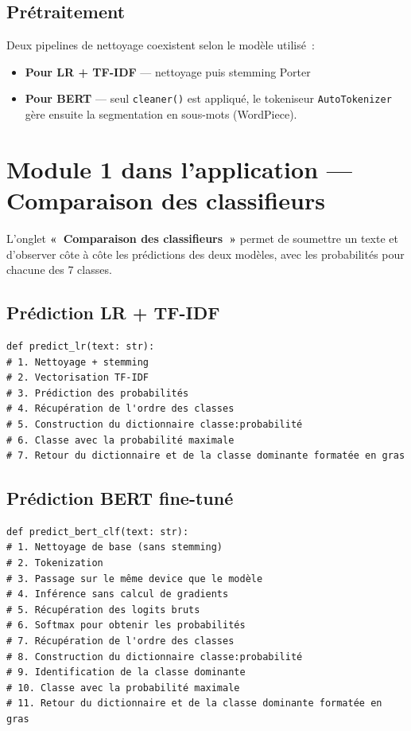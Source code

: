 \documentclass[12pt,a4paper]{report}
\begin{document}
\subsection{Prétraitement}

Deux pipelines de nettoyage coexistent selon le modèle utilisé~:

\begin{itemize}
\item \textbf{Pour LR + TF-IDF} — nettoyage puis stemming Porter
\item \textbf{Pour BERT} — seul \texttt{cleaner()} est appliqué, le tokeniseur \texttt{AutoTokenizer} gère ensuite la segmentation en sous-mots (WordPiece).
\end{itemize}

\section{Module 1 dans l'application — Comparaison des classifieurs}

L'onglet \textbf{«~Comparaison des classifieurs~»} permet de soumettre un texte et
d'observer côte à côte les prédictions des deux modèles, avec les probabilités pour
chacune des 7 classes.

\subsection{Prédiction LR + TF-IDF}

\begin{lstlisting}
def predict_lr(text: str):
# 1. Nettoyage + stemming
# 2. Vectorisation TF-IDF
# 3. Prédiction des probabilités
# 4. Récupération de l'ordre des classes
# 5. Construction du dictionnaire classe:probabilité
# 6. Classe avec la probabilité maximale
# 7. Retour du dictionnaire et de la classe dominante formatée en gras
\end{lstlisting}

\subsection{Prédiction BERT fine-tuné}

\begin{lstlisting}
def predict_bert_clf(text: str):
# 1. Nettoyage de base (sans stemming)
# 2. Tokenization
# 3. Passage sur le même device que le modèle
# 4. Inférence sans calcul de gradients
# 5. Récupération des logits bruts
# 6. Softmax pour obtenir les probabilités
# 7. Récupération de l'ordre des classes
# 8. Construction du dictionnaire classe:probabilité
# 9. Identification de la classe dominante
# 10. Classe avec la probabilité maximale
# 11. Retour du dictionnaire et de la classe dominante formatée en gras
\end{lstlisting}
\end{document}
